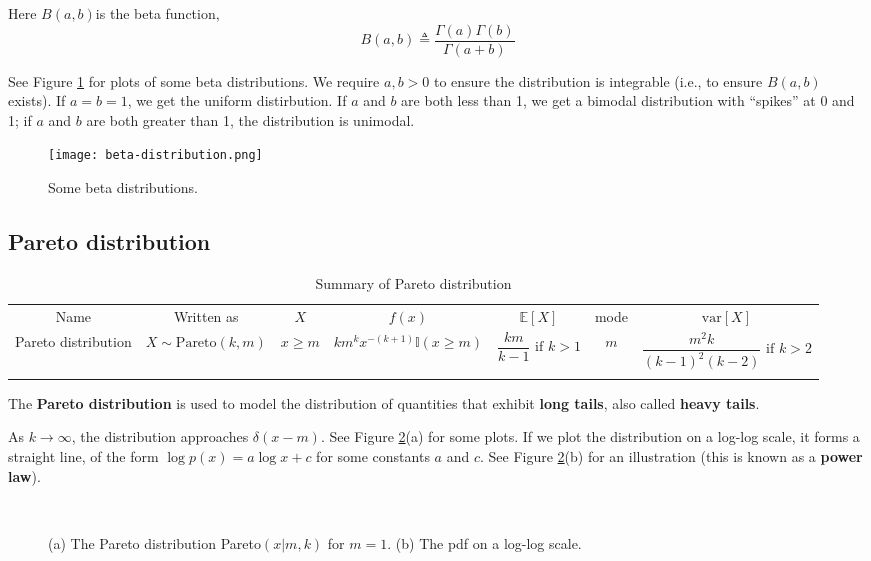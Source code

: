 Here $B(a, b)$is the beta function,
\begin{equation}
B(a,b) \triangleq \dfrac{\Gamma(a)\Gamma(b)}{\Gamma(a+b)}
\end{equation}

See Figure \ref{fig:beta-distribution} for plots of some beta distributions. We require  $a, b >0$ to ensure the distribution is integrable (i.e., to ensure $B(a, b)$ exists). If $a=b=1$, we get the uniform distirbution. If $a$ and $b$ are both less than 1, we get a bimodal distribution with “spikes” at 0 and 1; if $a$ and $b$ are both greater than 1, the distribution is unimodal.

\begin{figure}[hbtp]
\centering
    \texttt{[image: beta-distribution.png]}
\caption{Some beta distributions.}
\label{fig:beta-distribution} 
\end{figure}


\subsection{Pareto distribution}

\begin{table*}
\caption{Summary of Pareto distribution}
\centering
\begin{tabular}{ccccccc}
\hline\noalign{\smallskip}
Name & Written as & $X$ & $f(x)$ & $\mathbb{E}[X]$ & mode & $\text{var}[X]$ \\
\noalign{\smallskip}\svhline\noalign{\smallskip}
Pareto distribution & $X \sim \text{Pareto}(k,m)$ & $x \geq m$ & $km^kx^{-(k+1)}\mathbb{I}(x \geq m)$ & $\dfrac{km}{k-1} \text{ if } k > 1$ & $m$ & $\dfrac{m^2k}{(k-1)^2(k-2)} \text{ if } k>2$ \\
\noalign{\smallskip}\hline
\end{tabular}
\end{table*} 

The \textbf{Pareto distribution} is used to model the distribution of quantities that exhibit \textbf{long tails}, also called \textbf{heavy tails}.

As $k \rightarrow \infty$, the distribution approaches $\delta(x-m)$. See Figure \ref{fig:Pareto-distribution}(a) for some plots. If we plot the distribution on a log-log scale, it forms a straight line, of the form $\log p(x)=a\log x+c$ for some constants $a$ and $c$. See Figure \ref{fig:Pareto-distribution}(b) for an illustration (this is known as a \textbf{power law}).

\begin{figure}[hbtp]
\centering
{} \\
\caption{(a) The Pareto distribution Pareto$(x|m, k)$ for $m=1$. (b) The pdf on a log-log scale.}
\label{fig:Pareto-distribution} 
\end{figure}


